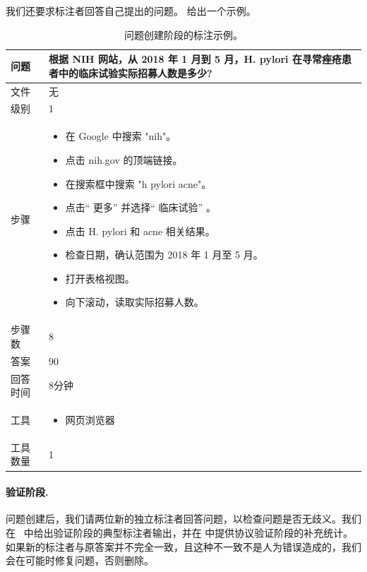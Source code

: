 \documentclass{fairmeta}
\begin{document}
我们还要求标注者回答自己提出的问题。 给出一个示例。

\begin{table}[]
 \centering
 \small
 \begin{tabularx}{\textwidth}{lX}
 \toprule
 问题&根据 NIH 网站，从 2018 年 1 月到 5 月，H. pylori 在寻常痤疮患者中的临床试验实际招募人数是多少?\\
 \midrule
 文件&无\\
 \midrule
 级别& 1 \\
 \midrule
 步骤&
 \begin{itemize}
 \item[-] 在 Google 中搜索 "nih"。
\item[-] 点击 nih.gov 的顶端链接。
\item[-] 在搜索框中搜索 "h pylori acne"。
\item[-] 点击“ 更多” 并选择“ 临床试验” 。
\item[-] 点击 H. pylori 和 acne 相关结果。
\item[-] 检查日期，确认范围为 2018 年 1 月至 5 月。
\item[-] 打开表格视图。
\item[-] 向下滚动，读取实际招募人数。
 \end{itemize} \\
 \midrule
 步骤数& 8 \\
 \midrule
 答案& 90 \\
 \midrule
 回答时间&8分钟\\
 \midrule
 工具& \begin{itemize}
 \item[-] 网页浏览器
 \end{itemize} \\
 \midrule
 工具数量& 1 \\
 \bottomrule
 \end{tabularx}
 \caption{问题创建阶段的标注示例。}
 \label{tab:annotated_question}
\end{table}

\paragraph{验证阶段.} 问题创建后，我们请两位新的独立标注者回答问题，以检查问题是否无歧义。我们在~ 中给出验证阶段的典型标注者输出，并在 中提供协议验证阶段的补充统计。如果新的标注者与原答案并不完全一致，且这种不一致不是人为错误造成的，我们会在可能时修复问题，否则删除。
\end{document}
